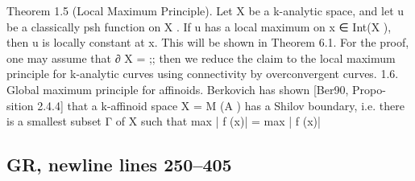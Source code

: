 \documentclass[
  10pt,
]{article}
\newenvironment{Shaded}{}{}
\newcommand{\NormalTok}[1]{#1}
\begin{document}
\begin{Shaded}
\begin{Highlighting}[]
\NormalTok{Theorem 1.5 (Local Maximum Principle). Let X be a k{-}analytic space, and let u be a}
\NormalTok{classically psh function on X . If u has a local maximum on x ∈ Int(X ), then u is locally}
\NormalTok{constant at x.}
\NormalTok{  This will be shown in Theorem 6.1. For the proof, one may assume that ∂ X = ;;}
\NormalTok{then we reduce the claim to the local maximum principle for k{-}analytic curves using}
\NormalTok{connectivity by overconvergent curves.}
\NormalTok{1.6. Global maximum principle for affinoids. Berkovich has shown [Ber90, Propo{-}}
\NormalTok{sition 2.4.4] that a k{-}affinoid space X = M (A ) has a Shilov boundary, i.e. there is a}
\NormalTok{smallest subset Γ of X such that}
\NormalTok{                                 max | f (x)| = max | f (x)|}
\end{Highlighting}
\end{Shaded}

\subsection{GR, newline lines 250--405}\label{gr-newline-lines-250405}
\end{document}
